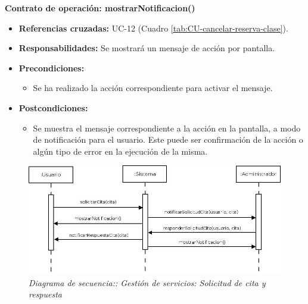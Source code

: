 \textbf{Contrato de operación: mostrarNotificacion()}
\begin{itemize}
\item \textbf{Referencias cruzadas:} UC-12 (Cuadro \ref{tab:CU-cancelar-reserva-clase}).
\item \textbf{Responsabilidades:} Se mostrará un mensaje de acción por pantalla.
\item \textbf{Precondiciones:} 
 \begin{itemize}
\item Se ha realizado la acción correspondiente para activar el mensaje.
\end {itemize}
\item \textbf{Postcondiciones:} 
 \begin{itemize}
\item Se muestra el mensaje correspondiente a la acción en la pantalla, a modo de notificación para el usuario. Este puede ser confirmación de la acción o algún tipo de error en la ejecución de la misma.
\end {itemize}
\end {itemize}


\vspace{10mm}

\begin{figure}
\centering
  \includegraphics[scale=.45]{img/secuencias/gestion-servicios-solicitar-responder-cita.jpeg}
  \caption{\textit{Diagrama de secuencia:: Gestión de servicios: Solicitud de cita y respuesta}}
  \label{fig:secuencia-gestion-servicios-solicitar-responder-cita.jpeg}
\end{figure}

